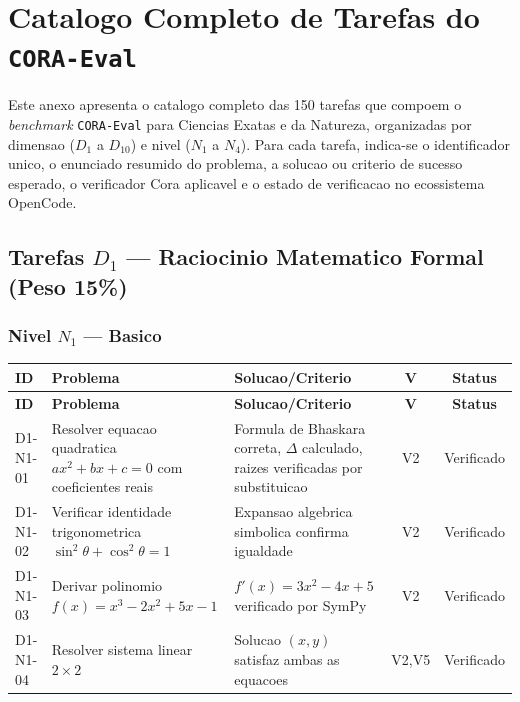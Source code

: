 
\section{Catalogo Completo de Tarefas do \texttt{CORA-Eval}}

Este anexo apresenta o catalogo completo das 150 tarefas que compoem o \textit{benchmark} \texttt{CORA-Eval} para Ciencias Exatas e da Natureza, organizadas por dimensao ($D_1$ a $D_{10}$) e nivel ($N_1$ a $N_4$). Para cada tarefa, indica-se o identificador unico, o enunciado resumido do problema, a solucao ou criterio de sucesso esperado, o verificador Cora aplicavel e o estado de verificacao no ecossistema OpenCode.

\subsection{Tarefas $D_1$ --- Raciocinio Matematico Formal (Peso 15\%)}

\subsubsection{Nivel $N_1$ --- Basico}

\begin{longtable}{|p{2.0cm}|p{4.2cm}|p{4.2cm}|c|c|}
\hline
\textbf{ID} & \textbf{Problema} & \textbf{Solucao/Criterio} & \textbf{V} & \textbf{Status} \\
\hline
\endfirsthead
\hline
\textbf{ID} & \textbf{Problema} & \textbf{Solucao/Criterio} & \textbf{V} & \textbf{Status} \\
\hline
\endhead
\hline
\endfoot
D1-N1-01 & Resolver equacao quadratica $ax^{2}+bx+c=0$ com coeficientes reais & Formula de Bhaskara correta, $\Delta$ calculado, raizes verificadas por substituicao & V2 & Verificado \\
\hline
D1-N1-02 & Verificar identidade trigonometrica $\sin^{2}\theta+\cos^{2}\theta=1$ & Expansao algebrica simbolica confirma igualdade & V2 & Verificado \\
\hline
D1-N1-03 & Derivar polinomio $f(x)=x^{3}-2x^{2}+5x-1$ & $f'(x)=3x^{2}-4x+5$ verificado por SymPy & V2 & Verificado \\
\hline
D1-N1-04 & Resolver sistema linear $2\times 2$ & Solucao $(x,y)$ satisfaz ambas as equacoes & V2,V5 & Verificado \\
\hline
\end{longtable}

